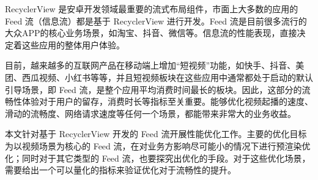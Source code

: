 RecyclerView 是安卓开发领域最重要的流式布局组件，市面上大多数的应用的 Feed 流（信息流）都是基于 RecyclerView 进行开发。Feed 流是目前很多流行的大众APP的核心业务场景，如淘宝、抖音、微信等。信息流的性能表现，直接决定着这些应用的整体用户体验。

目前，越来越多的互联网产品在移动端上增加“短视频”功能，如快手、抖音、美团、西瓜视频、小红书等等，并且短视频板块在这些应用中通常都处于启动的默认引导场景，即 Feed 流，是整个应用平均消费时间最长的板块。因此，这部分的流畅性体验对于用户的留存，消费时长等指标至关重要。能够优化视频起播的速度、滑动的流畅度、网络请求速度等任何一个场景，都能带来非常大的业务收益。

本文针对基于 RecyclerView 开发的 Feed 流开展性能优化工作。主要的优化目标为以视频场景为核心的 Feed 流，在对业务方影响尽可能小的情况下进行预渲染优化；同时对于其它类型的 Feed 流，也要探究出优化的手段。对于这些优化场景，需要给出一个可以量化的指标来验证优化对于流畅性的提升。







